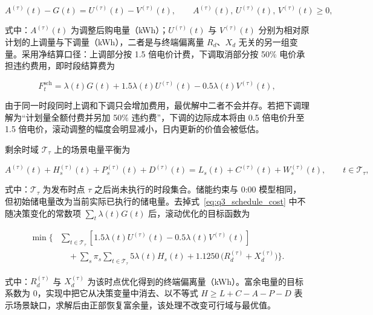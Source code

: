 \begin{equation}
  A^{(\tau)}(t) - G(t) = U^{(\tau)}(t) - V^{(\tau)}(t),
  \qquad
  A^{(\tau)}(t),\,U^{(\tau)}(t),\,V^{(\tau)}(t) \ge 0,
  \label{eq:q3_adjust}
\end{equation}

式中：$A^{(\tau)}(t)$ 为调整后购电量（kWh）；$U^{(\tau)}(t)$ 与 $V^{(\tau)}(t)$ 分别为相对原计划的上调量与下调量（kWh），二者是与终端偏离量 $R_d$、$X_d$ 无关的另一组变量。采用净结算口径：上调部分按 1.5 倍电价计费，下调取消部分按 50\% 电价承担违约费用，即时段结算费为

\begin{equation}
  F_t^{\mathrm{sch}} = \lambda(t)G(t) + 1.5\lambda(t)U^{(\tau)}(t) - 0.5\lambda(t)V^{(\tau)}(t),
  \label{eq:q3_schedule_cost}
\end{equation}

由于同一时段同时上调和下调只会增加费用，最优解中二者不会并存。若把下调理解为``计划量全额付费并另加 50\% 违约费''，下调的边际成本将由 0.5 倍电价升至 1.5 倍电价，滚动调整的幅度会明显减小，日内更新的价值会被低估。

剩余时域 $\mathcal T_\tau$ 上的场景电量平衡为

\begin{equation}
  A^{(\tau)}(t) + H^{(\tau)}_s(t) + P^{(\tau)}_s(t) + D^{(\tau)}(t)
  = L_s(t) + C^{(\tau)}(t) + W^{(\tau)}_s(t),
  \qquad t \in \mathcal T_\tau,
  \label{eq:q3_rolling_balance}
\end{equation}

式中：$\mathcal T_\tau$ 为发布时点 $\tau$ 之后尚未执行的时段集合。储能约束与 0:00 模型相同，但初始储电量改为当前实际已执行的储电量。去掉式~\eqref{eq:q3_schedule_cost} 中不随决策变化的常数项 $\sum_t\lambda(t)G(t)$ 后，滚动优化的目标函数为

\begin{equation}
  \begin{aligned}
    \min\Biggl\{
      &\sum_{t\in\mathcal T_\tau}\left[1.5\lambda(t)U^{(\tau)}(t) - 0.5\lambda(t)V^{(\tau)}(t)\right] \\
      &\quad + \sum_s \pi_s \sum_{t\in\mathcal T_\tau} 5\lambda(t) H_s(t)
      + 1.1250\,\bigl(R_d^{(\tau)} + X_d^{(\tau)}\bigr)\Biggr\}.
  \end{aligned}
  \label{eq:q3_objroll}
\end{equation}

式中：$R_d^{(\tau)}$ 与 $X_d^{(\tau)}$ 为该时点优化得到的终端偏离量（kWh）。富余电量的目标系数为 0，实现中把它从决策变量中消去、以不等式 $H \ge L + C - A - P - D$ 表示场景缺口，求解后由正部恢复富余量，该处理不改变可行域与最优值。

